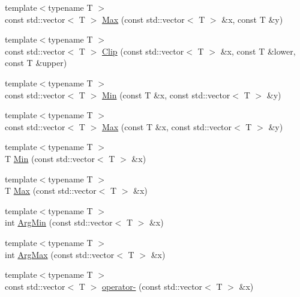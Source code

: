 \begin{DoxyCompactItemize}
\item 
{\footnotesize template$<$typename T $>$ }\\const std\+::vector$<$ T $>$ \hyperlink{centroidalifold_2contrafold_2_utilities_8ipp_af841c8c9a54b2630ae1358106e935d53}{Max} (const std\+::vector$<$ T $>$ \&x, const T \&y)
\item 
{\footnotesize template$<$typename T $>$ }\\const std\+::vector$<$ T $>$ \hyperlink{centroidalifold_2contrafold_2_utilities_8ipp_a288a761be65529c192ec9789756c48e2}{Clip} (const std\+::vector$<$ T $>$ \&x, const T \&lower, const T \&upper)
\item 
{\footnotesize template$<$typename T $>$ }\\const std\+::vector$<$ T $>$ \hyperlink{centroidalifold_2contrafold_2_utilities_8ipp_af4d253c4343fceb20b2c92bbcff8badd}{Min} (const T \&x, const std\+::vector$<$ T $>$ \&y)
\item 
{\footnotesize template$<$typename T $>$ }\\const std\+::vector$<$ T $>$ \hyperlink{centroidalifold_2contrafold_2_utilities_8ipp_a5f6f45fe7c9e63a2596082df4dddee75}{Max} (const T \&x, const std\+::vector$<$ T $>$ \&y)
\item 
{\footnotesize template$<$typename T $>$ }\\T \hyperlink{centroidalifold_2contrafold_2_utilities_8ipp_a2dd62e43a08f8d50213d9fdb3dbe2a6b}{Min} (const std\+::vector$<$ T $>$ \&x)
\item 
{\footnotesize template$<$typename T $>$ }\\T \hyperlink{centroidalifold_2contrafold_2_utilities_8ipp_af7b575076b6bd5018f1b2681f09770a3}{Max} (const std\+::vector$<$ T $>$ \&x)
\item 
{\footnotesize template$<$typename T $>$ }\\int \hyperlink{centroidalifold_2contrafold_2_utilities_8ipp_a3cab2f565c065835d243beabab3c2337}{Arg\+Min} (const std\+::vector$<$ T $>$ \&x)
\item 
{\footnotesize template$<$typename T $>$ }\\int \hyperlink{centroidalifold_2contrafold_2_utilities_8ipp_a98578538a8ce83b01d3973a1a171d4ec}{Arg\+Max} (const std\+::vector$<$ T $>$ \&x)
\item 
{\footnotesize template$<$typename T $>$ }\\const std\+::vector$<$ T $>$ \hyperlink{centroidalifold_2contrafold_2_utilities_8ipp_a568eb68e84ad744ccb15f88abf2db1a3}{operator-\/} (const std\+::vector$<$ T $>$ \&x)

\end{DoxyCompactItemize}
